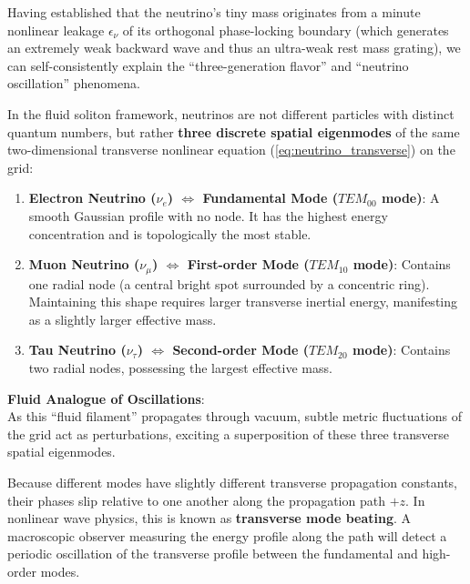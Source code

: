 \documentclass[12pt, a4paper]{article}
\begin{document}
Having established that the neutrino's tiny mass originates from a minute nonlinear leakage $\epsilon_\nu$ of its orthogonal phase-locking boundary (which generates an extremely weak backward wave and thus an ultra-weak rest mass grating), we can self-consistently explain the ``three-generation flavor'' and ``neutrino oscillation'' phenomena.

In the fluid soliton framework, neutrinos are not different particles with distinct quantum numbers, but rather \textbf{three discrete spatial eigenmodes} of the same two-dimensional transverse nonlinear equation (\ref{eq:neutrino_transverse}) on the grid:
\begin{enumerate}
    \item \textbf{Electron Neutrino ($\nu_e$) $\iff$ Fundamental Mode ($TEM_{00}$ mode)}: A smooth Gaussian profile with no node. It has the highest energy concentration and is topologically the most stable.
    
    \item \textbf{Muon Neutrino ($\nu_\mu$) $\iff$ First-order Mode ($TEM_{10}$ mode)}: Contains one radial node (a central bright spot surrounded by a concentric ring). Maintaining this shape requires larger transverse inertial energy, manifesting as a slightly larger effective mass.
    
    \item \textbf{Tau Neutrino ($\nu_\tau$) $\iff$ Second-order Mode ($TEM_{20}$ mode)}: Contains two radial nodes, possessing the largest effective mass.
\end{enumerate}

\textbf{Fluid Analogue of Oscillations}: \\
As this ``fluid filament'' propagates through vacuum, subtle metric fluctuations of the grid act as perturbations, exciting a superposition of these three transverse spatial eigenmodes.

Because different modes have slightly different transverse propagation constants, their phases slip relative to one another along the propagation path $+z$. In nonlinear wave physics, this is known as \textbf{transverse mode beating}. A macroscopic observer measuring the energy profile along the path will detect a periodic oscillation of the transverse profile between the fundamental and high-order modes.
\end{document}
